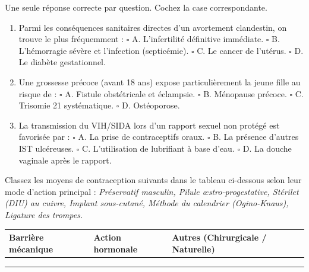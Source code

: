 \documentclass[11pt]{article}
\begin{document}
\begin{exercice}
Une seule réponse correcte par question. Cochez la case correspondante.
\begin{enumerate}
    \item Parmi les conséquences sanitaires directes d'un avortement clandestin, on trouve le plus fréquemment :
    $\square$ A. L'infertilité définitive immédiate. \quad $\square$ B. L'hémorragie sévère et l'infection (septicémie). \quad $\square$ C. Le cancer de l'utérus. \quad $\square$ D. Le diabète gestationnel.
    
    \item Une grossesse précoce (avant 18 ans) expose particulièrement la jeune fille au risque de :
    $\square$ A. Fistule obstétricale et éclampsie. \quad $\square$ B. Ménopause précoce. \quad $\square$ C. Trisomie 21 systématique. \quad $\square$ D. Ostéoporose.
    
    \item La transmission du VIH/SIDA lors d'un rapport sexuel non protégé est favorisée par :
    $\square$ A. La prise de contraceptifs oraux. \quad $\square$ B. La présence d'autres IST ulcéreuses. \quad $\square$ C. L'utilisation de lubrifiant à base d'eau. \quad $\square$ D. La douche vaginale après le rapport.
\end{enumerate}
\end{exercice}

\begin{exercice}
Classez les moyens de contraception suivants dans le tableau ci-dessous selon leur mode d'action principal : \textit{Préservatif masculin, Pilule œstro-progestative, Stérilet (DIU) au cuivre, Implant sous-cutané, Méthode du calendrier (Ogino-Knaus), Ligature des trompes.}

\begin{tabular}{|p{3.5cm}|p{3.5cm}|p{3.5cm}|}
\hline
\textbf{Barrière mécanique} & \textbf{Action hormonale} & \textbf{Autres (Chirurgicale / Naturelle)} \\ \hline
 &  &  \\ \hline
 &  &  \\ \hline
 &  &  \\ \hline
\end{tabular}
\end{exercice}
\end{document}
